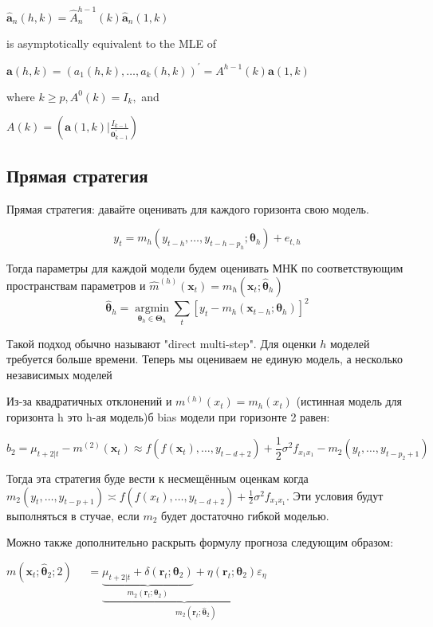 \documentclass[a4paper,12pt]{article}
\begin{document}
$\hat{\mathbf{a}}_{n}(h, k)=\hat{A}_{n}^{h-1}(k) \hat{\mathbf{a}}_{n}(1, k)$

is asymptotically equivalent to the MLE of

$\mathbf{a}(h, k)=\left(a_{1}(h, k), \ldots, a_{k}(h, k)\right)^{\prime}=A^{h-1}(k) \mathbf{a}(1, k)$

where $k \geq p, A^{0}(k)=I_{k},$ and


$A(k)=\left(\mathbf{a}(1, k) | \frac{I_{k-1}}{\mathbf{0}_{k-1}^{\prime}}\right)$
\subsection{Прямая стратегия}

Прямая стратегия: давайте оценивать для каждого горизонта свою модель.

\[ y_{t}=m_{h}\left(y_{t-h}, \ldots, y_{t-h-p_{h}} ; \boldsymbol{\theta}_{h}\right)+e_{t, h} \]

Тогда параметры для каждой модели будем оценивать МНК по соответствующим пространствам параметров и $ \hat{m}^{(h)}\left(\boldsymbol{x}_{t}\right)=m_{h}\left(\boldsymbol{x}_{t} ; \hat{\boldsymbol{\theta}}_{h}\right) $
\[ \hat{\boldsymbol{\theta}}_{h}=\underset{\boldsymbol{\theta}_{h} \in \boldsymbol{\Theta}_{h}}{\operatorname{argmin}} \sum_{t}\left[y_{t}-m_{h}\left(\boldsymbol{x}_{t-h} ; \boldsymbol{\theta}_{h}\right)\right]^{2} \]

Такой подход обычно называют "direct multi-step". Для оценки $ h $ моделей требуется больше времени. Теперь мы оцениваем не единую модель, а несколько независимых моделей

Из-за квадратичных отклонений и $ m^{(h)}\left(x_{t}\right)=m_{h}\left(x_{t}\right) $ (истинная модель для горизонта h это h-ая модель)б bias модели при горизонте 2 равен:

\[ b_{2}=\mu_{t+2 | t}-m^{(2)}\left(\boldsymbol{x}_{t}\right) \approx f\left(f\left(\boldsymbol{x}_{t}\right), \ldots, y_{t-d+2}\right)+\frac{1}{2} \sigma^{2} f_{x_{1} x_{1}}-m_{2}\left(y_{t}, \ldots, y_{t-p_{2}+1}\right) \]

Тогда эта стратегия буде вести к несмещённым оценкам когда $m_{2}\left(y_{t}, \ldots, y_{t-p+1}\right) \asymp f\left(f\left(x_{t}\right), \ldots, y_{t-d+2}\right)+ \frac{1}{2} \sigma^{2} f_{x_{1} x_{1}}$. Эти условия будут выполняться в стучае, если $ m_2 $ будет достаточно гибкой моделью.

Можно также дополнительно раскрыть формулу прогноза следующим образом:

$m\left(\boldsymbol{x}_{t} ; \hat{\boldsymbol{\theta}}_{2} ; 2\right)$
$\quad=\underbrace{\underbrace{\mu_{t+2 | t}+\delta\left(\boldsymbol{r}_{t} ; \boldsymbol{\theta}_{2}\right)}_{m_{2}\left(\boldsymbol{r}_{t} ; \boldsymbol{\theta}_{2}\right)}+\eta\left(\boldsymbol{r}_{t} ; \boldsymbol{\theta}_{2}\right) \varepsilon_{\eta} }_{\quad \quad \quad m_{2}\left(\boldsymbol{r}_{t} ; \hat{\boldsymbol{\theta}}_{2}\right)}$
\end{document}
